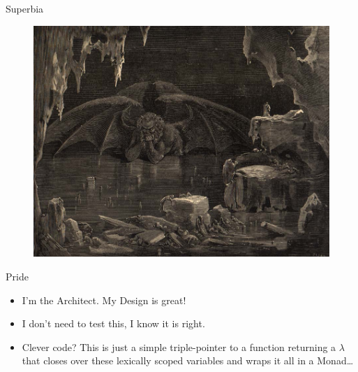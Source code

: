 \documentclass[12pt,xcolor=x11names]{beamer}
\begin{document}
\begin{frame}{Superbia}
    \begin{figure}
        \centering \includegraphics[height=0.75\textheight]{pride.jpg}
    \end{figure}
\end{frame}
\begin{frame}{Pride}
    \begin{itemize}
        \item I'm the Architect. My Design is great!
        \item I don't need to test this, I know it is right.
        \item Clever code? This is just a simple triple-pointer to a function
            returning a $\lambda$ that closes over these lexically scoped
            variables and wraps it all in a Monad\ldots
    \end{itemize}
\end{frame}
\end{document}
